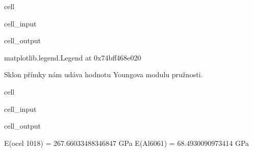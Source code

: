 \documentclass[letterpaper,10pt,english]{jupyterBook}
\begin{document}
{{\begin{sphinxuseclass}{cell}
\begin{sphinxVerbatimInput}
\begin{sphinxuseclass}{cell_input}
\end{sphinxuseclass}\end{sphinxVerbatimInput}
\begin{sphinxVerbatimOutput}

\begin{sphinxuseclass}{cell_output}
\begin{sphinxVerbatim}[commandchars=\\\{\}]
\PYGZlt{}matplotlib.legend.Legend at 0x74bff468e020\PYGZgt{}
\end{sphinxVerbatim}

\noindent{}

\end{sphinxuseclass}\end{sphinxVerbatimOutput}

\end{sphinxuseclass}
\sphinxAtStartPar
Sklon přímky nám udáva hodnotu Youngova modulu pružnosti.

\begin{sphinxuseclass}{cell}\begin{sphinxVerbatimInput}

\begin{sphinxuseclass}{cell_input}
\begin{sphinxVerbatim}[commandchars=\\\{\}]
\PYG{p}{[}\PYG{p}{]}
\PYG{p}{[}\PYG{p}{]}
\end{sphinxVerbatim}

\end{sphinxuseclass}\end{sphinxVerbatimInput}
\begin{sphinxVerbatimOutput}

\begin{sphinxuseclass}{cell_output}
\begin{sphinxVerbatim}[commandchars=\\\{\}]
E(ocel 1018) = 267.66033488346847 GPa
E(Al6061) = 68.4930090973414 GPa
\end{sphinxVerbatim}


\end{sphinxuseclass}
\end{sphinxVerbatimOutput}
\end{sphinxuseclass}}}
\end{document}
